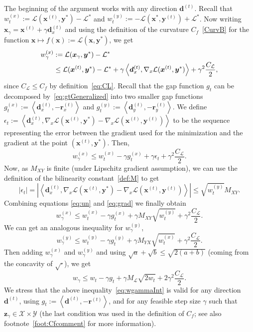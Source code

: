 \documentclass[twoside]{article}
\renewcommand{\L}{\mathcal{L}}
\newcommand{\X}{\mathcal{X}}
\newcommand{\Y}{\mathcal{Y}}
\newcommand{\prodscal}[2]{\left\langle#1,#2\right\rangle}
\newcommand{\x}{\bm{x}}
\newcommand{\y}{\bm{y}}
\newcommand{\z}{\bm{z}}
\newcommand{\xt}{\bm{x}^{(t)}}
\newcommand{\dt}{\bm{d}^{(t)}}
\newcommand{\rt}{\r^{(t)}}
\newcommand{\yt}{\bm{y}^{(t)}}
\newcommand{\wt}{w_t}
\newcommand{\gnx}{\nabla_x\L(\xt,\yt)}
\newcommand{\gap}{g_{t}}
\newcommand{\stepsize}{\gamma}
\renewcommand{\r}{\bm{r}}
\newcommand{\0}{\mathbf{0}} %
\begin{document}
  \proof 
    The beginning of the argument works with any direction $\dt$. 
    Recall that $\wt^{(x)} := \L(\xt, \y^*)- \L^*$ and $\wt^{(y)} := -\L(\x^*,\yt) + \L^*$.
    Now writing $\x_\gamma = \xt + \gamma \dt_x$ and using the definition of the curvature $C_f$~\eqref{CurvB} for the function $\x \mapsto f(\x) := \L(\x,\y^*)$, we get
      \begin{align}
      w_\gamma^{(x)} &:= \L(\x_\gamma,\y^*) - \L^* \notag\\
        &\leq \L(\xt, \y^*) - \L^* + \gamma \prodscal{\dt_x}{\nabla_x\L(\xt, \y^*)} + \gamma^2 \frac{C_\L}{2},
      \end{align} 
    since $C_\L \leq C_f$ by definition~\eqref{eq:CL}. 
    Recall that the gap function $\gap$ can be decomposed by~\eqref{eq:gtGeneralized} into two smaller gap functions $\gap^{(x)} := \prodscal{\dt_x}{-\rt_x}$ and $\gap^{(y)} := \prodscal{\dt_y}{-\rt_y}$. We define $\epsilon_t := \prodscal{\dt_x}{\nabla_x\L(\xt, \y^*)- \gnx}$ to be the sequence representing the error between the gradient used for the minimization and the gradient at the point $(\xt, \y^*)$. Then,
       \begin{equation}\label{eq:un}
          w_\gamma^{(x)}   \leq   \wt^{(x)} - \gamma \gap^{(x)} +\gamma \epsilon_t + \gamma^2 \frac{C_\L}{2}.
      \end{equation}
    Now, as $M_{XY}$ is finite (under Lipschitz gradient assumption), we can use the definition of the bilinearity constant~\eqref{def:M} to get
      \begin{equation}\label{eq:grad}
      |\epsilon_t| = \left|\prodscal{\dt_x}{\nabla_x\L(\xt, \y^*)- \gnx}\right| \leq \sqrt{\wt^{(y)}} M_{XY}.
       \end{equation}
    Combining equations \eqref{eq:un} and \eqref{eq:grad} we finally obtain
      \begin{equation}
        w_\gamma^{(x)} \leq \wt^{(x)} - \gamma \gap^{(x)} + \gamma M_{XY} \sqrt{\wt^{(y)}}
          + \gamma^2\frac{ C_\L}{2}.
      \end{equation}
     We can get an analogous inequality for $w_\gamma^{(y)}$,
       \begin{equation}
        w_\gamma^{(y)} \leq \wt^{(y)} - \gamma \gap^{(y)} + \gamma M_{YX} \sqrt{ \wt^{(x)}}
          + \gamma^2 \frac{C_\L}{2}.
      \end{equation}
    Then adding $w_\gamma^{(x)}$ and $w_\gamma^{(y)}$ and using $\sqrt{a} + \sqrt{b} \leq \sqrt{2(a+b)}$ (coming from the concavity of $\sqrt{\cdot}$), we get
      \begin{equation} \label{eq:wgammaInt}
      w_\gamma\leq  \wt - \gamma \gap +\gamma M_{\L} \sqrt{2\wt}+ 2\gamma^2 \frac{C_\L}{2}.
      \end{equation}
    We stress that the above inequality~\eqref{eq:wgammaInt} is valid for any direction $\dt$, using $g_t := \prodscal{\dt}{-\rt}$, and for any feasible step size $\stepsize$ such that $\z_\stepsize \in \X \times \Y$ (the last condition was used in the definition of $C_f$; see also footnote~\ref{foot:Cfcomment} for more information).
      
\end{document}

